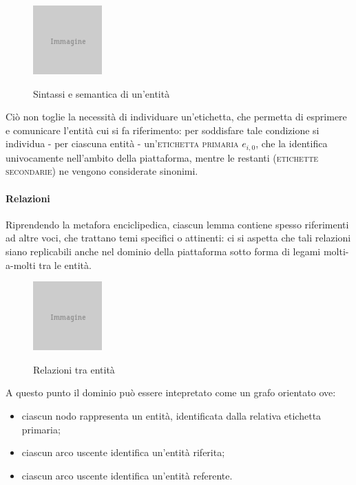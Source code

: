 \begin{figure}[ht]
\begin{center}
\includegraphics{placeholder.png}
\label{fig:tesi:stage:fase-uno:entita-sintassi-semantica}
\caption{Sintassi e semantica di un'entità}
\end{center}
\end{figure}

Ciò non toglie la necessità di individuare un'etichetta, che permetta di esprimere e comunicare l'entità cui si fa riferimento: per soddisfare tale condizione si individua - per ciascuna entità - un'\textsc{etichetta primaria} $e_{i,0}$, che la identifica univocamente nell'ambito della piattaforma, mentre le restanti (\textsc{etichette secondarie}) ne vengono considerate sinonimi.


\paragraph{Relazioni}
Riprendendo la metafora enciclipedica, ciascun lemma contiene spesso riferimenti ad altre voci, che trattano temi specifici o attinenti: ci si aspetta che tali relazioni siano replicabili anche nel dominio della piattaforma sotto forma di legami molti-a-molti tra le entità.

\begin{figure}[ht]
\begin{center}
\includegraphics{placeholder.png}
\label{fig:tesi:stage:fase-uno:entita-relazioni}
\caption{Relazioni tra entità}
\end{center}
\end{figure}

A questo punto il dominio può essere intepretato come un grafo orientato ove:
\begin{itemize}
\item ciascun nodo rappresenta un entità, identificata dalla relativa etichetta primaria;
\item ciascun arco uscente identifica un'entità riferita;
\item ciascun arco uscente identifica un'entità referente.
\end{itemize}

